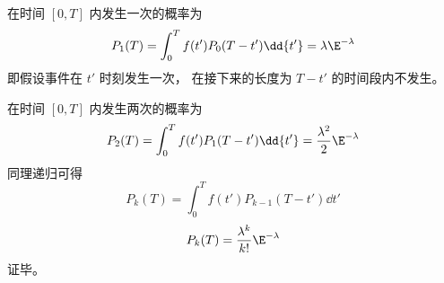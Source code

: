 在时间 $[0,T]$ 内发生一次的概率为
\begin{equation}
P_1(T) = \int_{0}^{T} f(t') P_0(T-t')\dd{t'} = \lambda \E^{-\lambda}
\end{equation}
即假设事件在 $t'$ 时刻发生一次， 在接下来的长度为 $T-t'$ 的时间段内不发生。

在时间 $[0,T]$ 内发生两次的概率为
\begin{equation}
P_2(T) = \int_{0}^{T} f(t') P_1(T-t')\dd{t'} = \frac{\lambda^2}{2}\E^{-\lambda}
\end{equation}
同理递归可得
\begin{equation}
P_{k}(T) = \int_{0}^{T} f(t') P_{k-1}(T-t')\dd{t'}
\end{equation}
\begin{equation}
P_k(T) = \frac{\lambda^k}{k!}\E^{-\lambda}
\end{equation}
证毕。
